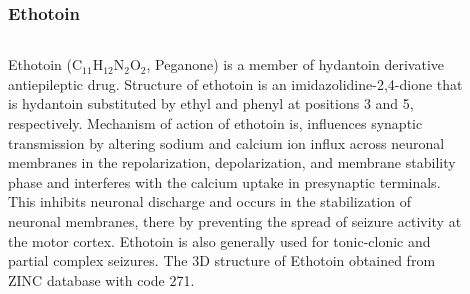 \frametitle{Ethotoin}
\begin{columns}
	\begin{column}{0.6\linewidth}
		\small
		Ethotoin (C$_{11}$H$_{12}$N$_{2}$O$_{2}$, Peganone) is a member of hydantoin derivative antiepileptic drug.
		Structure of ethotoin is an imidazolidine-2,4-dione that is hydantoin substituted by ethyl and phenyl at positions 3 and 5, respectively.
		Mechanism of action of ethotoin is, influences synaptic transmission by altering sodium and calcium ion influx across neuronal membranes in the repolarization, depolarization, and membrane stability phase and interferes with the calcium uptake in presynaptic terminals.
		This inhibits neuronal discharge and occurs in the stabilization of neuronal membranes, there by preventing the spread of seizure activity at the motor cortex.
		Ethotoin is also generally used for tonic-clonic and partial complex seizures.
		The 3D structure of Ethotoin obtained from ZINC database with code 271.
	\end{column}
	\begin{column}{0.4\linewidth}
		\begin{figure}
			\texttt{[image: ethotoin\_str.png]}
			\caption{\centering The structure of Ethotoin.}
			\label{fig:eth_structure}
		\end{figure}
	\end{column}
\end{columns}	